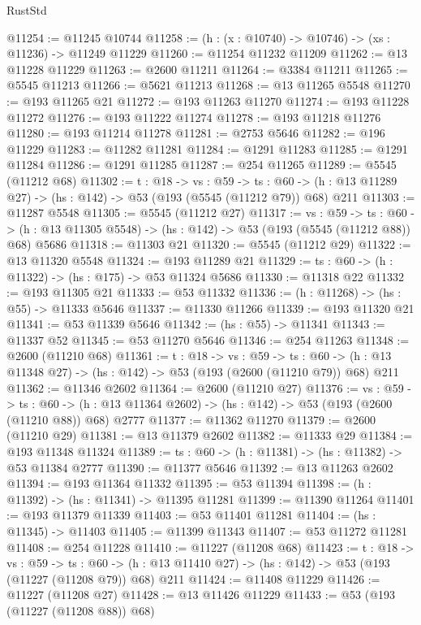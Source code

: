 \begin{lexlean}{RustStd}
\begin{coremodule}
@11254 := @11245 @10744
@11258 := (h : (x : @10740) -> @10746) -> (xs : @11236) -> @11249 @11229
@11260 := @11254 @11232 @11209
@11262 := @13 @11228 @11229
@11263 := @2600 @11211
@11264 := @3384 @11211
@11265 := @5545 @11213
@11266 := @5621 @11213
@11268 := @13 @11265 @5548
@11270 := @193 @11265 @21
@11272 := @193 @11263 @11270
@11274 := @193 @11228 @11272
@11276 := @193 @11222 @11274
@11278 := @193 @11218 @11276
@11280 := @193 @11214 @11278
@11281 := @2753 @5646
@11282 := @196 @11229
@11283 := @11282 @11281
@11284 := @1291 @11283
@11285 := @1291 @11284
@11286 := @1291 @11285
@11287 := @254 @11265
@11289 := @5545 (@11212 @68)
@11302 := {t : @18} ->
  {vs : @59} ->
  {ts : @60} -> (h : @13 @11289 @27) -> (hs : @142) -> @53 (@193 (@5545 (@11212 @79)) @68) @211
@11303 := @11287 @5548
@11305 := @5545 (@11212 @27)
@11317 := {vs : @59} ->
  {ts : @60} -> (h : @13 @11305 @5548) -> (hs : @142) -> @53 (@193 (@5545 (@11212 @88)) @68) @5686
@11318 := @11303 @21
@11320 := @5545 (@11212 @29)
@11322 := @13 @11320 @5548
@11324 := @193 @11289 @21
@11329 := {ts : @60} -> (h : @11322) -> (hs : @175) -> @53 @11324 @5686
@11330 := @11318 @22
@11332 := @193 @11305 @21
@11333 := @53 @11332
@11336 := (h : @11268) -> (hs : @55) -> @11333 @5646
@11337 := @11330 @11266
@11339 := @193 @11320 @21
@11341 := @53 @11339 @5646
@11342 := (hs : @55) -> @11341
@11343 := @11337 @52
@11345 := @53 @11270 @5646
@11346 := @254 @11263
@11348 := @2600 (@11210 @68)
@11361 := {t : @18} ->
  {vs : @59} ->
  {ts : @60} -> (h : @13 @11348 @27) -> (hs : @142) -> @53 (@193 (@2600 (@11210 @79)) @68) @211
@11362 := @11346 @2602
@11364 := @2600 (@11210 @27)
@11376 := {vs : @59} ->
  {ts : @60} -> (h : @13 @11364 @2602) -> (hs : @142) -> @53 (@193 (@2600 (@11210 @88)) @68) @2777
@11377 := @11362 @11270
@11379 := @2600 (@11210 @29)
@11381 := @13 @11379 @2602
@11382 := @11333 @29
@11384 := @193 @11348 @11324
@11389 := {ts : @60} -> (h : @11381) -> (hs : @11382) -> @53 @11384 @2777
@11390 := @11377 @5646
@11392 := @13 @11263 @2602
@11394 := @193 @11364 @11332
@11395 := @53 @11394
@11398 := (h : @11392) -> (hs : @11341) -> @11395 @11281
@11399 := @11390 @11264
@11401 := @193 @11379 @11339
@11403 := @53 @11401 @11281
@11404 := (hs : @11345) -> @11403
@11405 := @11399 @11343
@11407 := @53 @11272 @11281
@11408 := @254 @11228
@11410 := @11227 (@11208 @68)
@11423 := {t : @18} ->
  {vs : @59} ->
  {ts : @60} -> (h : @13 @11410 @27) -> (hs : @142) -> @53 (@193 (@11227 (@11208 @79)) @68) @211
@11424 := @11408 @11229
@11426 := @11227 (@11208 @27)
@11428 := @13 @11426 @11229
@11433 := @53 (@193 (@11227 (@11208 @88)) @68)

\end{coremodule}
\end{lexlean}
